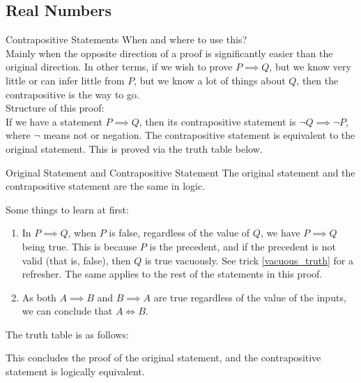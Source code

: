\subsection{Real Numbers}
\begin{Trick}{Contrapositive Statements}\label{contrapositive_proof}
    When and where to use this?\\
    Mainly when the opposite direction of a proof is significantly easier than the original direction. In other terms, if we wish to prove $P\implies Q$, but we know very little or can infer little from $P$, but we know a lot of things about $Q$, then the contrapositive is the way to go.\\
    Structure of this proof:\\
    If we have a statement $P\implies Q$, then its contrapositive statement is $\boxed{\neg Q\implies\neg P}$, where $\neg$ means not or negation. The contrapositive statement is equivalent to the original statement. This is proved via the truth table below.
\end{Trick}
\begin{Lemma}{Original Statement and Contrapositive Statement}\label{original_and_contrapositive_statement}
        The original statement and the contrapositive statement are the same in logic.
\end{Lemma}
\begin{lemma_proof}
    Some things to learn at first:
    \begin{enumerate}
        \item In $P\implies Q$, when $P$ is false, regardless of the value of $Q$, we have $P\implies Q$ being true. This is because $P$ is the precedent, and if the precedent is not valid (that is, false), then $Q$ is true vacuously. See trick \eqref{vacuous_truth} for a refresher. The same applies to the rest of the statements in this proof.
        \item As both $A\implies B$ and $B\implies A$ are true regardless of the value of the inputs, we can conclude that $A\iff B$.
    \end{enumerate}
    The truth table is as follows:
    \begin{table}[h!]
        \centering
    \end{table}
    \newline This concludes the proof of the original statement, and the contrapositive statement is logically equivalent.
\end{lemma_proof}
